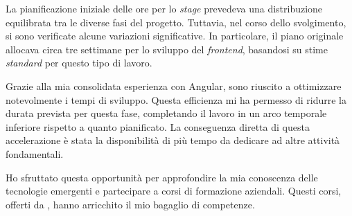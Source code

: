 La pianificazione iniziale delle ore per lo \textit{stage} prevedeva una distribuzione equilibrata tra le diverse fasi del progetto. 
Tuttavia, nel corso dello svolgimento, 
si sono verificate alcune variazioni significative. In particolare, il piano originale allocava circa tre settimane per lo sviluppo 
del \textit{frontend}, basandosi su stime \textit{standard} per questo tipo di lavoro.

Grazie alla mia consolidata esperienza con Angular, sono riuscito a ottimizzare notevolmente i tempi di sviluppo. 
Questa efficienza mi ha permesso di ridurre la durata prevista per questa fase, completando il lavoro in un arco temporale 
inferiore rispetto a quanto pianificato. La conseguenza diretta di questa accelerazione è stata la disponibilità di più 
tempo da dedicare ad altre attività fondamentali.

Ho sfruttato questa opportunità per approfondire la mia conoscenza delle tecnologie emergenti e partecipare a corsi di 
formazione aziendali. Questi corsi, offerti da \azienda{}, hanno arricchito il mio bagaglio di competenze.
